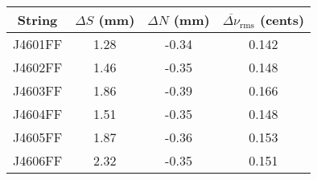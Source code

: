 \begin{tabular}{cccc}
\toprule
String & $\Delta S$ (mm) & $\Delta N$ (mm) & $\overline{\Delta \nu}_\text{rms}$ (cents) \\
\midrule
J4601FF & 1.28 & -0.34 & 0.142 \\
J4602FF & 1.46 & -0.35 & 0.148 \\
J4603FF & 1.86 & -0.39 & 0.166 \\
J4604FF & 1.51 & -0.35 & 0.148 \\
J4605FF & 1.87 & -0.36 & 0.153 \\
J4606FF & 2.32 & -0.35 & 0.151 \\
\bottomrule
\end{tabular}
